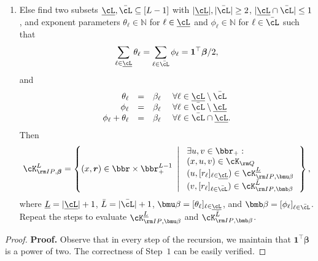 \documentclass[mnsc, nonblindrev]{informswp}
\newcommand{\1}[1]{\mathds{1}{\left(#1\right)}}
\begin{document}
\begin{appendices}
\begin{theorem}
\begin{enumerate}[Step 1.]
\item Else find two subsets $\underline \cL, \bar \cL  \subseteq [L-1]$ with $|\underline \cL|, |\bar \cL| \geq 2$, $|\underline \cL \cap \bar \cL| \leq 1$, and exponent parameters $\theta_\ell \in \mathbb{N}$ for $\ell \in \underline \cL$ and $\phi_\ell \in \mathbb{N}$ for $\ell \in \bar \cL$ such that 
$$
\sum_{\ell \in \underline \cL} \theta_\ell = \sum_{\ell \in \bar\cL} \phi_\ell = \bm 1^\top \bm \beta/2,
$$
and
$$
\begin{array}{rcll} 
\theta_\ell &=& \beta_\ell &~\forall \ell \in \underline \cL \setminus \bar \cL \\
\phi_\ell &=& \beta_\ell &~\forall \ell \in \bar \cL \setminus \underline  \cL \\
\phi_\ell + \theta_\ell &=& \beta_\ell &~\forall \ell \in \bar \cL \cap  \underline  \cL.
\end{array}
$$
Then 
$$
\cK^{L}_{{\rm IP},\bm \beta} = \left\{ (x,\bm r) \in \bbr\times \bbr^{L-1}_+ ~\left|~ 
\begin{array}{ll} \exists u,  v \in \bbr_+: \\
(x,u,v) \in \cK_{{\rm Q}} \\
(u, [r_\ell]_{\ell \in \underline \cL}) \in \cK^{\underline L}_{{\rm IP},\bmu \beta} \\
(v, [r_\ell]_{\ell \in \bar \cL}) \in \cK^{\bar L}_{{\rm IP},{\bmb \beta}} \\
\end{array}
\right.\right\},
$$
where $\underline L = | \underline \cL|+1$, $\bar L = | \bar \cL|+1$, $\bmu \beta = [\theta_\ell]_{\ell \in \underline \cL}$, and $\bmb \beta = [\phi_\ell]_{\ell \in \bar \cL}$. Repeat the steps to evaluate $ \cK^{\underline L}_{{\rm IP},\bmu \beta}$ and $\cK^{\bar L}_{{\rm IP},{\bmb \beta}}$.
\end{enumerate}
\end{theorem}
\begin{proof}{\bf Proof.}
Observe that in every step of the recursion, we maintain that $\bm 1^\top \bm \beta$ is a power of two. The correctness of Step~$1$ can be easily verified. 


\end{proof}
\end{appendices}
\end{document}

